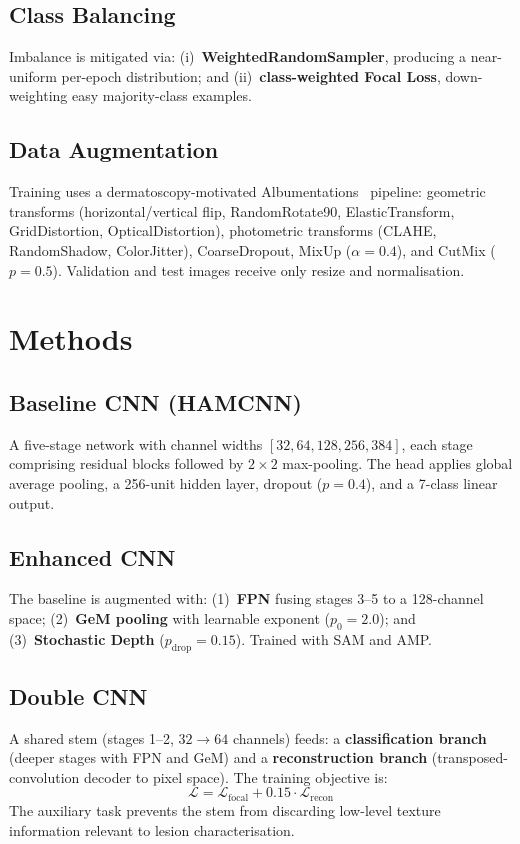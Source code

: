 \documentclass[10pt,twocolumn]{article}
\begin{document}
\subsection{Class Balancing}
Imbalance is mitigated via: (i)~\textbf{WeightedRandomSampler}, producing a near-uniform per-epoch distribution; and (ii)~\textbf{class-weighted Focal Loss}, down-weighting easy majority-class examples.

\subsection{Data Augmentation}
Training uses a dermatoscopy-motivated Albumentations~\cite{buslaev2020albumentations} pipeline: geometric transforms (horizontal/vertical flip, RandomRotate90, ElasticTransform, GridDistortion, OpticalDistortion), photometric transforms (CLAHE, RandomShadow, ColorJitter), CoarseDropout, MixUp ($\alpha=0.4$), and CutMix ($p=0.5$). Validation and test images receive only resize and normalisation.

\section{Methods}
\label{sec:methods}

\subsection{Baseline CNN (HAMCNN)}
A five-stage network with channel widths $[32,64,128,256,384]$, each stage comprising residual blocks followed by $2\times2$ max-pooling. The head applies global average pooling, a 256-unit hidden layer, dropout ($p=0.4$), and a 7-class linear output.

\subsection{Enhanced CNN}
The baseline is augmented with: (1)~\textbf{FPN} fusing stages 3--5 to a 128-channel space; (2)~\textbf{GeM pooling} with learnable exponent ($p_0=2.0$); and (3)~\textbf{Stochastic Depth} ($p_{\mathrm{drop}}=0.15$). Trained with SAM and AMP.

\subsection{Double CNN}
A shared stem (stages 1--2, $32\to64$ channels) feeds: a \textbf{classification branch} (deeper stages with FPN and GeM) and a \textbf{reconstruction branch} (transposed-convolution decoder to pixel space). The training objective is:
\begin{equation}
  \mathcal{L} = \mathcal{L}_{\mathrm{focal}} + 0.15\cdot\mathcal{L}_{\mathrm{recon}}
\end{equation}
The auxiliary task prevents the stem from discarding low-level texture information relevant to lesion characterisation.
\end{document}
